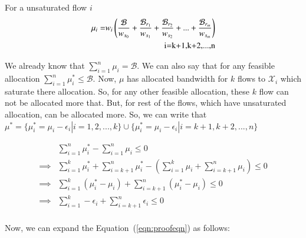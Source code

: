 For a unsaturated flow $i$
\begin{equation}
\label{eqn:case3-3}
\begin{split}
\mu_i =& w_i \left( \frac{\mathcal{B}}{w_{s_0}} + \frac{\mathcal{B}_{r_1}}{w_{s_1}} + \frac{\mathcal{B}_{r_2}}{w_{s_2}} + ... + \frac{\mathcal{B}_{r_m}}{w_{s_m}} \right) 
\\ & \omit\hfill \text{} i=k+1,k+2,...,n\\
\end{split}
\end{equation}


We already know that $\sum_{i=1}^{n} \mu_i = \mathcal{B}$. We can also say that for any feasible allocation  $\sum_{i=1}^{n} \mu_i^* \le \mathcal{B}$. Now, $\mu$ has allocated bandwidth for $k$ flows to $\mathcal{X}_i$ which saturate there allocation. So, for any other feasible allocation, these $k$ flow can not be allocated more that. But, for rest of the flows, which have unsaturated allocation, can be allocated more. So, we can write that $\mu^* = \{\mu_i^* = \mu_i - \epsilon_i | i=1,2,...,k\}\cup\{\mu_i^* = \mu_i - \epsilon_i | i=k+1,k+2,...,n\}$

\begin{equation}
\label{eqn:case3-4}
\begin{split}
&\sum_{i=1}^{n} \mu_i^* - \sum_{i=1}^{n} \mu_i \le 0 \\
\implies & \sum_{i=1}^{k} \mu_i^* + \sum_{i=k+1}^{n} \mu_i^* - \left( \sum_{i=1}^{k} \mu_i + \sum_{i=k+1}^{n} \mu_i \right) \le 0 \\
\implies & \sum_{i=1}^{k} (\mu_i^* - \mu_i) + \sum_{i=k+1}^{n} (\mu_i^* - \mu_i) \le 0 \\
\implies & \sum_{i=1}^{k} -\epsilon_i + \sum_{i=k+1}^{n} \epsilon_i \le 0 \\
\end{split}
\end{equation}



Now, we can expand the Equation~(\ref{eqn:proofeqn}) as follows:


